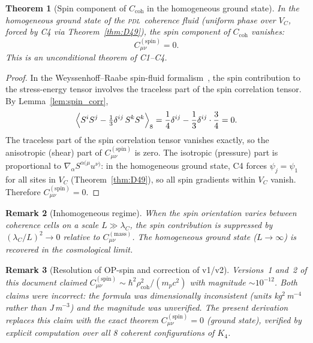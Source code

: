 \documentclass[12pt,a4paper]{article}
\newtheorem{theorem}{Theorem}[section]
\newtheorem{remark}[theorem]{Remark}
\newcommand{\Kfour}{K_4}
\newcommand{\hb}{\hbar}
\newcommand{\PDL}{\textsc{pdl}}
\newcommand{\Ccoh}{C_{\mathrm{coh}}}
\newcommand{\Cmass}{C^{(\mathrm{mass})}}
\newcommand{\Cspin}{C^{(\mathrm{spin})}}
\newcommand{\rhocoh}{\rho_{\mathrm{coh}}}
\newcommand{\lambdaC}{\lambda_C}
\newcommand{\VC}{V_C}
\begin{document}
\begin{theorem}[Spin component of $\Ccoh$ in the homogeneous ground state]
\label{thm:Cspin}
In the homogeneous ground state of the \PDL\ coherence fluid (uniform phase over $\VC$, forced by C4 via Theorem~\ref{thm:D49}), the spin component of $\Ccoh$ vanishes:
\begin{equation}
\Cspin_{\mu\nu} = 0.
\label{eq:Cspin}
\end{equation}
This is an unconditional theorem of C1--C4.
\end{theorem}

\begin{proof}
In the Weyssenhoff--Raabe spin-fluid formalism~\cite{Weyssenhoff_1947}, the spin contribution to the stress-energy tensor involves the traceless part of the spin correlation tensor. By Lemma~\ref{lem:spin_corr},
\begin{equation}
\Bigl\langle S^i S^j - \tfrac{1}{3}\delta^{ij}\,S^k S^k\Bigr\rangle_8 = \frac{1}{4}\delta^{ij} - \frac{1}{3}\delta^{ij}\cdot\frac{3}{4} = 0.
\end{equation}
The traceless part of the spin correlation tensor vanishes exactly, so the anisotropic (shear) part of $\Cspin_{\mu\nu}$ is zero. The isotropic (pressure) part is proportional to $\nabla_\alpha S^{\alpha(\mu}u^{\nu)}$: in the homogeneous ground state, C4 forces $\psi_j = \psi_1$ for all sites in $\VC$ (Theorem~\ref{thm:D49}), so all spin gradients within $\VC$ vanish. Therefore $\Cspin_{\mu\nu} = 0$.
\end{proof}

\begin{remark}[Inhomogeneous regime]
When the spin orientation varies between coherence cells on a scale $L \gg \lambdaC$, the spin contribution is suppressed by $(\lambdaC/L)^2 \to 0$ relative to $\Cmass_{\mu\nu}$. The homogeneous ground state ($L \to \infty$) is recovered in the cosmological limit.
\end{remark}

\begin{remark}[Resolution of OP-spin and correction of v1/v2]
Versions~1 and~2 of this document claimed $\Cspin_{\mu\nu} \sim \hb^2\rhocoh^2/(m_p c^2)$ with magnitude $\sim 10^{-12}$. Both claims were incorrect: the formula was dimensionally inconsistent (units kg$^2$\,m$^{-4}$ rather than J\,m$^{-3}$) and the magnitude was unverified. The present derivation replaces this claim with the exact theorem $\Cspin_{\mu\nu} = 0$ (ground state), verified by explicit computation over all 8 coherent configurations of $\Kfour$.
\end{remark}
\end{document}
